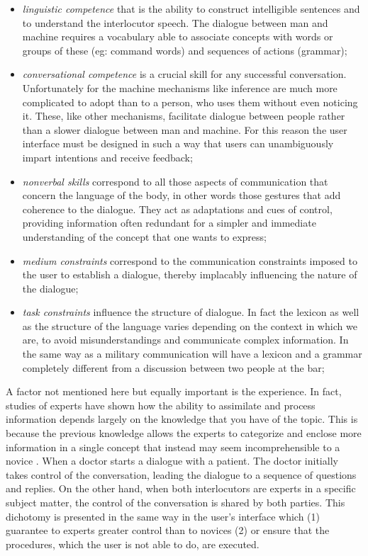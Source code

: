 \documentclass{thesisreport}
\begin{document}
 \begin{itemize}
     \item \textit{linguistic competence} that is the ability to construct intelligible sentences and to understand the interlocutor speech. The dialogue between man and machine requires a vocabulary able to associate concepts with words or groups of these (eg: command words) and sequences of actions (grammar);
     \item \textit{conversational competence} is a crucial skill for any successful conversation. Unfortunately for the machine mechanisms like inference are much more complicated to adopt than to a person, who uses them without even noticing it. These, like other mechanisms, facilitate dialogue between people rather than a slower dialogue between man and machine. For this reason the user interface must be designed in such a way that users can unambiguously impart intentions and receive feedback;
     \item \textit{nonverbal skills} correspond to all those aspects of communication that concern the language of the body, in other words those gestures that add coherence to the dialogue. They act as adaptations and cues of control, providing information often redundant for a simpler and immediate understanding of the concept that one wants to express;
     \item \textit{medium constraints} correspond to the communication constraints imposed to the user to establish a dialogue, thereby implacably influencing the nature of the dialogue;
     \item \textit{task constraints} influence the structure of dialogue. In fact the lexicon as well as the structure of the language  varies depending on the context in which we are, to avoid misunderstandings and communicate complex information. In the same way as a military communication  will have a lexicon and a grammar completely different from a discussion between two people at the bar;
     
 \end{itemize}
 A factor not mentioned here but equally important is the experience. In fact, studies of experts have shown how the ability to assimilate and process information depends largely on the knowledge that you have of the topic. This is because the previous knowledge allows the experts to categorize and enclose more information in a single concept that instead may seem incomprehensible to a novice \cite{fong2001collaboration}.
 When a doctor starts a dialogue with a patient. The doctor initially takes control of the conversation, leading the dialogue to a sequence of questions and replies. On the other hand, when both interlocutors are experts in a specific subject matter, the control of the conversation is shared by both parties.
 This dichotomy is presented in the same way in the user's interface which (1) guarantee to experts greater control than to novices (2) or ensure that the procedures, which the user is not able to do, are executed.
\end{document}
